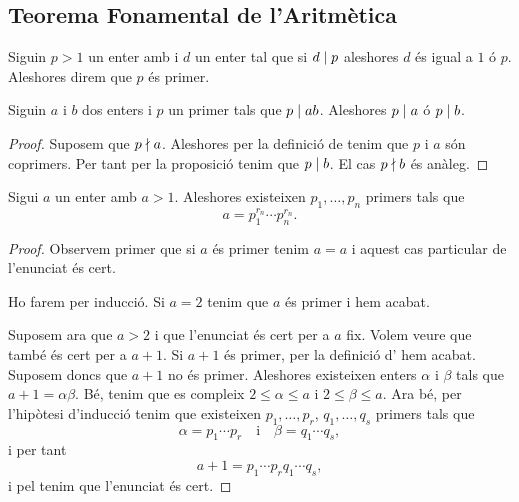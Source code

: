 \documentclass[../Apunts.tex]{subfiles}
\begin{document}
	\subsection{Teorema Fonamental de l'Aritmètica}
	\begin{definition}
		\label{def:enter primer}
		Siguin \(p>1\) un enter amb i \(d\) un enter tal que si \(d\mathrel{|} p\) aleshores \(d\) és igual a \(1\) ó \(p\). Aleshores direm que \(p\) és primer.
	\end{definition}
	\begin{proposition}
		\label{prop:Si un primer divideix al producte aleshores divideix els elements}
		Siguin \(a\) i \(b\) dos enters i \(p\) un primer tals que \(p\mathrel{|} ab\). Aleshores \(p\mathrel{|} a\) ó \(p\mathrel{|} b\).
		\begin{proof}
			Suposem que \(p\mathrel{\nmid} a\). Aleshores per la definició de  tenim que \(p\) i \(a\) són coprimers. Per tant per la proposició  tenim que \(p\mathrel{|} b\). El cas \(p\mathrel{\nmid} b\) és anàleg.
		\end{proof}
	\end{proposition}
	\begin{lemma}
		\label{lema:thm:Teorema Fonamental de l'Aritmètica 1}
		Sigui \(a\) un enter amb \(a>1\). Aleshores existeixen \(p_{1},\dots,p_{n}\) primers tals que
		\[a=p_{1}^{r_{n}}\cdots p_{n}^{r_{n}}.\]
		\begin{proof}
			Observem primer que si \(a\) és primer tenim \(a=a\) i aquest cas particular de l'enunciat és cert.
			
			Ho farem per inducció. Si \(a=2\) tenim que \(a\) és primer i hem acabat.
			
			Suposem ara que \(a>2\) i que l'enunciat és cert per a \(a\) fix. Volem veure que també és cert per a \(a+1\). Si \(a+1\) és primer, per la definició d' hem acabat. Suposem doncs que \(a+1\) no és primer. Aleshores existeixen enters \(\alpha\) i \(\beta\) tals que \(a+1=\alpha\beta\). Bé, tenim que es compleix \(2\leq\alpha\leq a\) i \(2\leq\beta\leq a\). Ara bé, per l'hipòtesi d'inducció tenim que existeixen \(p_{1},\dots,p_{r}\), \(q_{1},\dots,q_{s}\) primers tals que
			\[\alpha=p_{1}\cdots p_{r}\quad\text{i}\quad\beta=q_{1}\cdots q_{s},\]
			i per tant
			\[a+1=p_{1}\cdots p_{r}q_{1}\cdots q_{s},\]
			i pel  tenim que l'enunciat és cert.
		\end{proof}
	\end{lemma}
\end{document}
